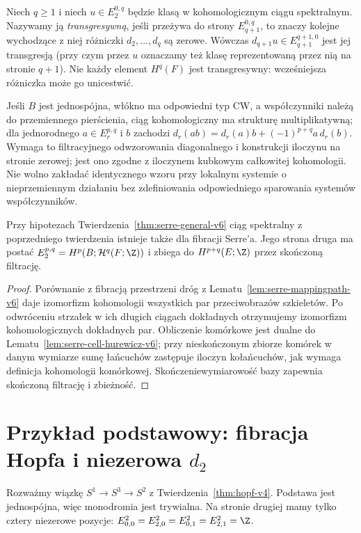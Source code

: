 \begin{definicja}
Niech $q\ge1$ i niech $u\in E_2^{0,q}$ będzie
klasą w kohomologicznym ciągu spektralnym.
Nazywamy ją \emph{transgresywną}, jeśli
przeżywa do strony $E_{q+1}^{0,q}$, to znaczy
kolejne wychodzące z niej różniczki
$d_2,\ldots,d_q$ są zerowe. Wówczas
$d_{q+1}u\in E_{q+1}^{q+1,0}$ jest jej transgresją
(przy czym przez $u$ oznaczamy też klasę reprezentowaną
przez nią na stronie $q+1$).
Nie każdy element $H^q(F)$ jest transgresywny:
wcześniejsza różniczka może go unicestwić.
\end{definicja}
\begin{uwaga}
Jeśli $B$ jest jednospójna, włókno ma odpowiedni typ CW,
a współczynniki należą do przemiennego pierścienia,
ciąg kohomologiczny ma strukturę multiplikatywną;
dla jednorodnego $a\in E_r^{p,q}$ i $b$ zachodzi
$d_r(ab)=d_r(a)b+(-1)^{p+q}a\,d_r(b)$.
Wymaga to filtracyjnego odwzorowania diagonalnego
i konstrukcji iloczynu na stronie zerowej; jest ono zgodne
z iloczynem kubkowym całkowitej kohomologii. Nie wolno
zakładać identycznego wzoru przy lokalnym systemie o
nieprzemiennym działaniu bez zdefiniowania odpowiedniego
sparowania systemów współczynników.
\end{uwaga}

\begin{wniosek}
Przy hipotezach Twierdzenia~\ref{thm:serre-general-v6}
ciąg spektralny z poprzedniego twierdzenia istnieje także
dla fibracji Serre'a. Jego strona druga ma postać
$E_2^{p,q}=H^p(B;\mathcal H^q(F;\Z))$ i zbiega
do $H^{p+q}(E;\Z)$ przez skończoną filtrację.
\end{wniosek}
\begin{proof}
Porównanie z fibracją przestrzeni dróg z
Lematu~\ref{lem:serre-mappingpath-v6} daje izomorfizm
kohomologii wszystkich par przeciwobrazów szkieletów.
Po odwróceniu strzałek w ich długich ciągach dokładnych
otrzymujemy izomorfizm kohomologicznych dokładnych par.
Obliczenie komórkowe jest dualne do
Lematu~\ref{lem:serre-cell-hurewicz-v6}; przy nieskończonym
zbiorze komórek w danym wymiarze sumę łańcuchów
zastępuje iloczyn kołańcuchów, jak wymaga definicja
kohomologii komórkowej. Skończeniewymiarowość bazy
zapewnia skończoną filtrację i zbieżność.
\end{proof}

\section{Przykład podstawowy: fibracja Hopfa i niezerowa \texorpdfstring{$d_2$}{d2}}
Rozważmy wiązkę $S^1\to S^3\to S^2$ z
Twierdzenia~\ref{thm:hopf-v4}. Podstawa jest jednospójna,
więc monodromia jest trywialna. Na stronie drugiej
mamy tylko cztery niezerowe pozycje:
$E^2_{0,0}=E^2_{2,0}=E^2_{0,1}=E^2_{2,1}=\Z$.


